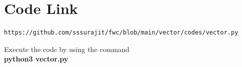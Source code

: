 \documentclass[12pt]{article}
\begin{document}
\section{\textbf{Code Link}}
\begin{lstlisting}
https://github.com/sssurajit/fwc/blob/main/vector/codes/vector.py
\end{lstlisting}
Execute the code by using the command\\
\textbf{python3 vector.py}
\end{document}
